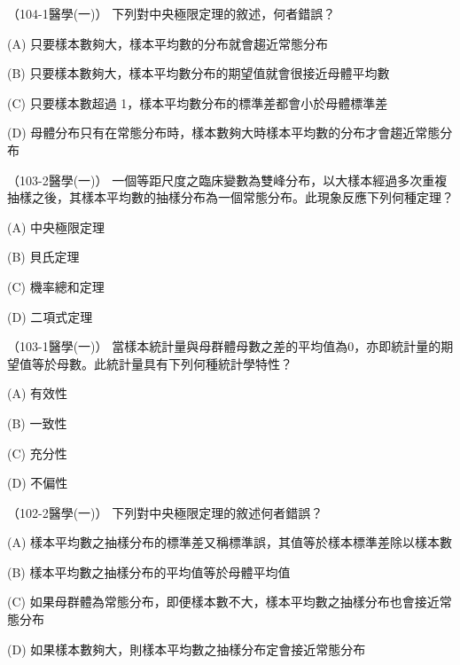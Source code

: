     \begin{docexam}{（104-1醫學(一)）}
        下列對中央極限定理的敘述，何者錯誤？
        
        (A) 只要樣本數夠大，樣本平均數的分布就會趨近常態分布
        
        (B) 只要樣本數夠大，樣本平均數分布的期望值就會很接近母體平均數
        
        (C) 只要樣本數超過 1，樣本平均數分布的標準差都會小於母體標準差
        
        (D) 母體分布只有在常態分布時，樣本數夠大時樣本平均數的分布才會趨近常態分布
    \end{docexam}

    \begin{docexam}{（103-2醫學(一)）}
        一個等距尺度之臨床變數為雙峰分布，以大樣本經過多次重複抽樣之後，其樣本平均數的抽樣分布為一個常態分布。此現象反應下列何種定理？
        
        (A) 中央極限定理
        
        (B) 貝氏定理
        
        (C) 機率總和定理
        
        (D) 二項式定理
    \end{docexam}

    \begin{docexam}{（103-1醫學(一)）}
        當樣本統計量與母群體母數之差的平均值為0，亦即統計量的期望值等於母數。此統計量具有下列何種統計學特性？
        
        (A) 有效性
        
        (B) 一致性
        
        (C) 充分性
        
        (D) 不偏性
    \end{docexam}

    \begin{docexam}{（102-2醫學(一)）}
        下列對中央極限定理的敘述何者錯誤？
        
        (A) 樣本平均數之抽樣分布的標準差又稱標準誤，其值等於樣本標準差除以樣本數
        
        (B) 樣本平均數之抽樣分布的平均值等於母體平均值
        
        (C) 如果母群體為常態分布，即便樣本數不大，樣本平均數之抽樣分布也會接近常態分布
        
        (D) 如果樣本數夠大，則樣本平均數之抽樣分布定會接近常態分布
    \end{docexam}